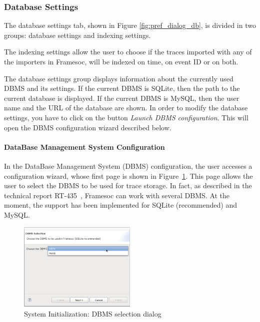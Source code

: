 \documentclass[twoside]{article}
\begin{document}
\begin{sloppypar}
\subsubsection{Database Settings}
The database settings tab, shown in Figure \ref{fig:pref_dialog_db}, is divided in two groups: database settings and indexing settings. 

The indexing settings allow the user to choose if the traces imported with any of the importers in Framesoc, will be indexed on time, on event ID or on both. 

The database settings group displays information about the currently used DBMS and its settings. If the current DBMS is SQLite, then the path to the current database is displayed. If the current DBMS is MySQL, then the user name and the URL of the database are shown. In order to modify the database settings, you have to click on the button \textit{Launch DBMS configuration}. This will open the DBMS configuration wizard described below.

\paragraph{DataBase Management System Configuration}
\label{subsec:init}

In the DataBase Management System (DBMS) configuration, the user accesses a configuration wizard, whose first page is shown in Figure~\ref{fig:dbms_selection}. 
This page allows the user to select the DBMS to be used for trace storage.
In fact, as described in the technical report RT-435~\cite{pagano:hal-00830008}, Framesoc can work with several DBMS.
At the moment, the support has been implemented for SQLite (recommended) and MySQL.

\begin{figure}[h!]
  \centering
    \includegraphics[width=0.5\textwidth]{images/dbms_selection.png}
  \caption{System Initialization: DBMS selection dialog}
  \label{fig:dbms_selection}
\end{figure}


\end{sloppypar}
\end{document}
